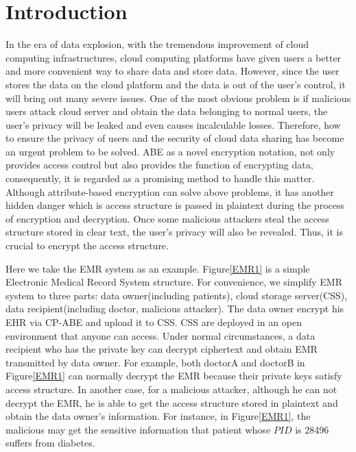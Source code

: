 \documentclass[smallextended]{svjour3}       %
\begin{document}
\section{Introduction}
	In the era of data explosion, with the tremendous improvement of cloud computing infrastructures, cloud computing platforms have given users a better and more convenient way to share data and store data.
	However, since the user stores the data on the cloud platform and the data is out of the user's control, it will bring out many severe issues.
	One of the most obvious problem is if malicious users attack cloud server and obtain the data belonging to normal users, the user's privacy will be leaked and even causes incalculable losses. 
	Therefore, how to ensure the privacy of users and the security of cloud data sharing has become an urgent problem to be solved. 
	ABE as a novel encryption notation, not only provides access control but also provides the function of encrypting data, consequently, it is regarded as a promising method to handle this matter. 
	Although attribute-based encryption can solve above problems, it has another hidden danger which is access structure is passed in plaintext during the process of encryption and decryption.
	Once some malicious attackers steal the access structure stored in clear text, the user's privacy will also be revealed. 
	Thus, it is crucial to encrypt the access structure.

	Here we take the EMR system as an example. 
	Figure\ref{EMR1} is a simple Electronic Medical Record System structure. 
	For convenience, we simplify EMR system to three parts: data owner(including patients), cloud storage server(CSS), data recipient(including doctor, malicious attacker).
	The data owner encrypt his EHR via CP-ABE and upload it to CSS. 
	CSS are deployed in an open environment that anyone can access.
	Under normal circumstances, a data recipient who has the private key can decrypt ciphertext and obtain EMR transmitted by data owner.
	For example, both doctorA and doctorB in Figure\ref{EMR1} can normally decrypt the EMR because their private keys satisfy access structure.
	In another case, for a malicious attacker, although he can not decrypt the EMR, he is able to get the access structure stored in plaintext and obtain the data owner's information.
	For instance, in Figure\ref{EMR1}, the malicious may get the sensitive information that patient whose $PID$ is 28496 suffers from diabetes.  
\end{document}
